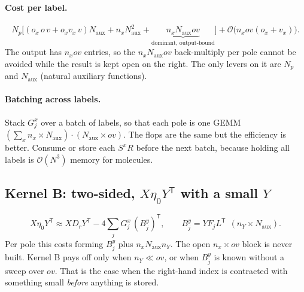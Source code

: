 \documentclass[11pt,a4paper]{article}
\newcommand{\Naux}{N_{\mathrm{aux}}}
\newcommand{\Np}{N_{p}}
\newcommand{\ov}{ov}
\begin{document}
\paragraph{Cost per label.}
\begin{equation}
  \Np\Big[(o_x\,o\,v+o_xv_x\,v)\Naux + n_x\Naux^2 + \underbrace{n_x\Naux\ov}_{\text{dominant, output-bound}}\Big]
  + \mathcal{O}\big(n_x\ov(o_x+v_x)\big).
\end{equation}
The output has $n_x\ov$ entries, so the $n_x\Naux\ov$ back-multiply per pole cannot be
avoided while the result is kept open on the right. The only levers on it are $\Np$ and
$\Naux$ (natural auxiliary functions).

\paragraph{Batching across labels.} Stack $G_j^x$ over a batch of labels, so that each pole is
one GEMM $(\sum_xn_x\times\Naux)\cdot(\Naux\times\ov)$. The flops are the same but the efficiency
is better. Consume or store each $S^xR$ before the next batch, because holding all labels is
$\mathcal{O}(N^3)$ memory for molecules.

\subsection{Kernel B: two-sided, $X\eta_0Y^{\mathsf T}$ with a small $Y$}

\begin{equation}
  X\eta_0Y^{\mathsf T} \approx XD_rY^{\mathsf T} - 4\sum_j G_j^x\,(B_j^y)^{\mathsf T},
  \qquad B_j^y = YF_jL^{\mathsf T}\ \ (n_Y\times\Naux).
\end{equation}
Per pole this costs forming $B_j^y$ plus $n_x\Naux n_Y$. The open $n_x\times\ov$ block is
never built. Kernel B pays off only when $n_Y\ll\ov$, or when $B_j^y$ is known without a sweep
over $\ov$. That is the case when the right-hand index is contracted with something small
\emph{before} anything is stored.
\end{document}

